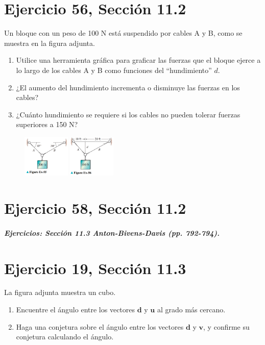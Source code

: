 \documentclass[11pt,letterpaper]{article}
\begin{document}
\section{Ejercicio 56, Sección 11.2}
Un bloque con un peso de 100 N está suspendido por cables A y B, como se muestra en la figura adjunta.
\begin{enumerate}
    \item Utilice una herramienta gráfica para graficar las fuerzas que el bloque ejerce a lo largo de los cables A y B como funciones del ``hundimiento'' $d$.
    \item ¿El aumento del hundimiento incrementa o disminuye las fuerzas en los cables?
    \item ¿Cuánto hundimiento se requiere si los cables no pueden tolerar fuerzas superiores a 150 N?
\end{enumerate}

\begin{figure}[h]
    \centering
    \includegraphics[width=0.2\textwidth]{imagenes/Figure_Ex-55.png}
    \hspace{5cm}
    \includegraphics[width=0.2\textwidth]{imagenes/Figure_Ex-56.png}
\end{figure}


\section{Ejercicio 58, Sección 11.2}


\subparagraph{Ejercicios: Sección 11.3 Anton-Bivens-Davis (pp. 792-794).}

\section{Ejercicio 19, Sección 11.3}
La figura adjunta muestra un cubo.
\begin{enumerate}
    \item Encuentre el ángulo entre los vectores $\mathbf{d}$ y $\mathbf{u}$ al grado más cercano.
    \item Haga una conjetura sobre el ángulo entre los vectores $\mathbf{d}$ y $\mathbf{v}$, y confirme su conjetura calculando el ángulo.
\end{enumerate}
\end{document}
